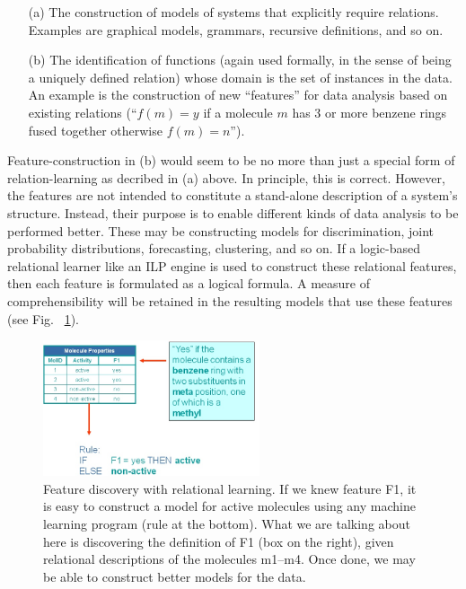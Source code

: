 \begin{enumerate}
    \item[(a)] The construction of models of systems
    that explicitly require relations. Examples are graphical models,
        grammars, recursive definitions, and so on.
    \item[(b)] The identification of functions
        (again used formally, in the sense of being a uniquely
        defined relation) whose domain is the set of instances in the data.
        An example is the construction of new ``features'' for data analysis
        based on existing relations (``$f(m) = y$ if a molecule $m$ has 3 or more
        benzene rings fused together otherwise $f(m) = n$''). 
\end{enumerate}

\noindent
Feature-construction in (b) would seem to be no more
than just a special form of relation-learning as decribed in (a) above. In
principle, this is correct. However, the
features are not intended to constitute a stand-alone
description of a system's structure. Instead, their purpose is to enable
different kinds of data analysis to be performed better. These may be constructing models
for discrimination, joint probability distributions,
forecasting, clustering, and so on. If a logic-based relational learner like an ILP
engine is used to construct these relational features,
then each feature is formulated as a logical formula.
A measure of comprehensibility will be retained in the resulting models that use
these features (see Fig. ~\ref{fig:features}).

\begin{figure}[h]
\centerline{\includegraphics[height=4cm]{features.jpg}}
\caption{Feature discovery with relational learning. If we knew feature
F1, it is easy to construct a model for active molecules using any
machine learning program (rule at the bottom).
What we are talking about here is discovering the definition of F1 (box on
the right), given relational descriptions of the molecules
m1--m4. Once done, we may be able to construct better
models for the data.}
\label{fig:features}
\end{figure}

